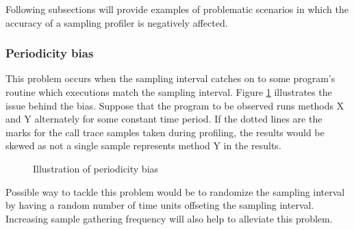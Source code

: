\documentclass[..thesis.tex]{subfiles}
\begin{document}
Following subsections will provide examples of problematic scenarios in which the accuracy of a sampling profiler is negatively affected.

\subsubsection{Periodicity bias}
This problem occurs when the sampling interval catches on to some program's routine which executions match the sampling interval. 
Figure \ref{fig:periodicityBias} illustrates the issue behind the bias. Suppose that the program to be observed runs methods X and Y alternately for some constant time period. If the dotted lines are the marks for the call trace samples taken during profiling, the results would be skewed as not a single sample represents method Y in the results. 

\begin{figure}[H]
\centering
{}
\caption{Illustration of periodicity bias}
\label{fig:periodicityBias}
\end{figure}

Possible way to tackle this problem would be to randomize the sampling interval by having a random number of time units offseting the sampling interval. Increasing sample gathering frequency will also help to alleviate this problem.
\end{document}
